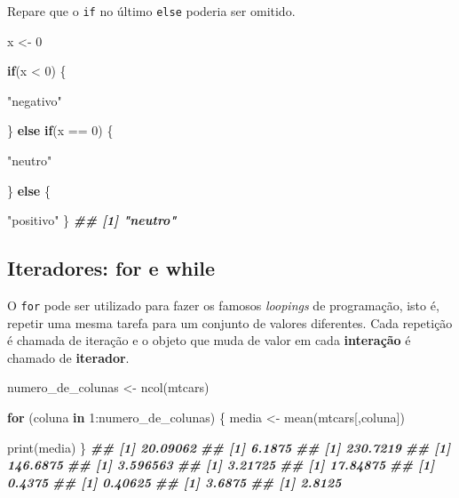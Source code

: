 \documentclass[
]{book}
\newenvironment{Shaded}{\begin{snugshade}}{\end{snugshade}}
\newcommand{\ControlFlowTok}[1]{\textcolor[rgb]{0.13,0.29,0.53}{\textbf{#1}}}
\newcommand{\DecValTok}[1]{\textcolor[rgb]{0.00,0.00,0.81}{#1}}
\newcommand{\DocumentationTok}[1]{\textcolor[rgb]{0.56,0.35,0.01}{\textbf{\textit{#1}}}}
\newcommand{\FunctionTok}[1]{\textcolor[rgb]{0.00,0.00,0.00}{#1}}
\newcommand{\NormalTok}[1]{#1}
\newcommand{\OtherTok}[1]{\textcolor[rgb]{0.56,0.35,0.01}{#1}}
\newcommand{\SpecialCharTok}[1]{\textcolor[rgb]{0.00,0.00,0.00}{#1}}
\newcommand{\StringTok}[1]{\textcolor[rgb]{0.31,0.60,0.02}{#1}}
\begin{document}
Repare que o \texttt{if} no último \texttt{else} poderia ser omitido.

\begin{Shaded}
\begin{Highlighting}[]
\NormalTok{x }\OtherTok{\textless{}{-}} \DecValTok{0}

\ControlFlowTok{if}\NormalTok{(x }\SpecialCharTok{\textless{}} \DecValTok{0}\NormalTok{) \{}
  
  \StringTok{"negativo"}
  
\NormalTok{\} }\ControlFlowTok{else} \ControlFlowTok{if}\NormalTok{(x }\SpecialCharTok{==} \DecValTok{0}\NormalTok{) \{}
  
  \StringTok{"neutro"}
  
\NormalTok{\} }\ControlFlowTok{else}\NormalTok{ \{}
  
  \StringTok{"positivo"}
\NormalTok{\}}
\DocumentationTok{\#\# [1] "neutro"}
\end{Highlighting}
\end{Shaded}

\hypertarget{iteradores-for-e-while}{%
\subsection{Iteradores: for e while}\label{iteradores-for-e-while}}

O \texttt{for} pode ser utilizado para fazer os famosos \emph{loopings} de programação, isto é, repetir uma mesma tarefa para um conjunto de valores diferentes. Cada repetição é chamada de iteração e o objeto que muda de valor em cada \textbf{interação} é chamado de \textbf{iterador}.

\begin{Shaded}
\begin{Highlighting}[]
\NormalTok{numero\_de\_colunas }\OtherTok{\textless{}{-}} \FunctionTok{ncol}\NormalTok{(mtcars)}

\ControlFlowTok{for}\NormalTok{ (coluna }\ControlFlowTok{in} \DecValTok{1}\SpecialCharTok{:}\NormalTok{numero\_de\_colunas) \{}
\NormalTok{  media }\OtherTok{\textless{}{-}} \FunctionTok{mean}\NormalTok{(mtcars[,coluna])}
  
  \FunctionTok{print}\NormalTok{(media)}
\NormalTok{\}}
\DocumentationTok{\#\# [1] 20.09062}
\DocumentationTok{\#\# [1] 6.1875}
\DocumentationTok{\#\# [1] 230.7219}
\DocumentationTok{\#\# [1] 146.6875}
\DocumentationTok{\#\# [1] 3.596563}
\DocumentationTok{\#\# [1] 3.21725}
\DocumentationTok{\#\# [1] 17.84875}
\DocumentationTok{\#\# [1] 0.4375}
\DocumentationTok{\#\# [1] 0.40625}
\DocumentationTok{\#\# [1] 3.6875}
\DocumentationTok{\#\# [1] 2.8125}
\end{Highlighting}
\end{Shaded}
\end{document}
